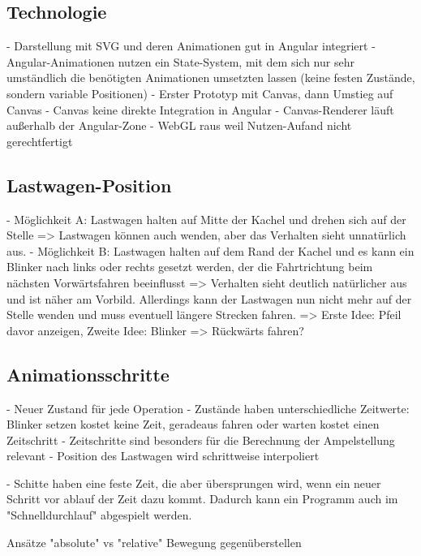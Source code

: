 \subsection{Technologie}

- Darstellung mit SVG und deren Animationen gut in Angular integriert
- Angular-Animationen nutzen ein State-System, mit dem sich nur sehr umständlich
  die benötigten Animationen umsetzten lassen (keine festen Zustände, sondern
  variable Positionen)
- Erster Prototyp mit Canvas, dann Umstieg auf Canvas
- Canvas keine direkte Integration in Angular
- Canvas-Renderer läuft außerhalb der Angular-Zone
- WebGL raus weil Nutzen-Aufand nicht gerechtfertigt

\subsection{Lastwagen-Position}

- Möglichkeit A: Lastwagen halten auf Mitte der Kachel und drehen sich auf der
                 Stelle => Lastwagen können auch wenden, aber das Verhalten
                 sieht unnatürlich aus.
- Möglichkeit B: Lastwagen halten auf dem Rand der Kachel und es kann ein
                 Blinker nach links oder rechts gesetzt werden, der die
                 Fahrtrichtung beim nächsten Vorwärtsfahren beeinflusst
                 => Verhalten sieht deutlich natürlicher aus und ist näher am
                 Vorbild. Allerdings kann der Lastwagen nun nicht mehr auf der
                 Stelle wenden und muss eventuell längere Strecken fahren.
                 => Erste Idee: Pfeil davor anzeigen, Zweite Idee: Blinker
                 => Rückwärts fahren?

\subsection{Animationsschritte}

- Neuer Zustand für jede Operation
- Zustände haben unterschiedliche Zeitwerte: Blinker setzen kostet keine Zeit,
  geradeaus fahren oder warten kostet einen Zeitschritt
- Zeitschritte sind besonders für die Berechnung der Ampelstellung relevant
- Position des Lastwagen wird schrittweise interpoliert

- Schitte haben eine feste Zeit, die aber übersprungen wird, wenn ein neuer
  Schritt vor ablauf der Zeit dazu kommt. Dadurch kann ein Programm auch im
  "Schnelldurchlauf" abgespielt werden.

Ansätze "absolute" vs "relative" Bewegung gegenüberstellen

